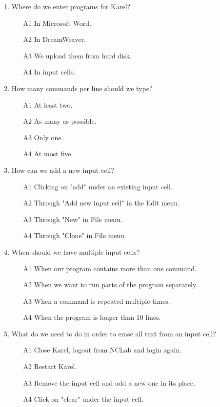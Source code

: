 \documentclass[article,A4,12pt]{llncs}
\begin{document}
\begin{enumerate}
\item Where do we enter programs for Karel?
\begin{enumerate}
\item[A1] In Microsoft Word.
\item[A2] In DreamWeaver.
\item[A3] We upload them from hard disk.
\item[A4] In input cells.
\end{enumerate}
\item How many commands per line should we type?
\begin{enumerate}
\item[A1] At least two.
\item[A2] As many as possible.
\item[A3] Only one.
\item[A4] At most five.
\end{enumerate}
\item How can we add a new input cell?
\begin{enumerate}
\item[A1] Clicking on "add" under an existing input cell.
\item[A2] Through "Add new input cell" in the Edit menu.
\item[A3] Through "New" in File menu.
\item[A4] Through "Clone" in File menu.
\end{enumerate}
\item When should we have multiple input cells?
\begin{enumerate}
\item[A1] When our program contains more than one command.
\item[A2] When we want to run parts of the program separately.
\item[A3] When a command is repeated multiple times.
\item[A4] When the program is longer than 10 lines.
\end{enumerate}
\item What do we need to do in order to erase all text from an input cell?
\begin{enumerate}
\item[A1] Close Karel, logout from NCLab and login again. 
\item[A2] Restart Karel.
\item[A3] Remove the input cell and add a new one in its place.
\item[A4] Click on "clear" under the input cell.

\end{enumerate}
\end{enumerate}
\end{document}
